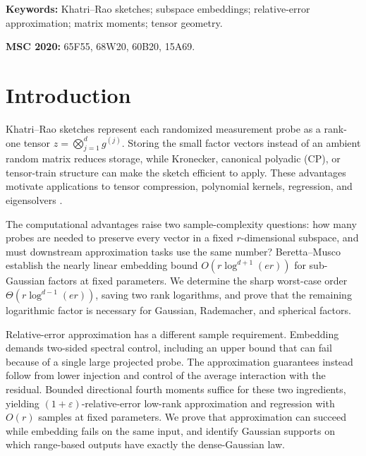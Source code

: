 \documentclass[11pt,a4paper]{article}
\theoremstyle{definition}\newtheorem{definition}[theorem]{Definition}
\theoremstyle{remark}\newtheorem{remark}[theorem]{Remark}
\numberwithin{equation}{section}
\begin{document}
\noindent\textbf{Keywords:} Khatri--Rao sketches; subspace embeddings;
relative-error approximation; matrix moments; tensor geometry.
\par\smallskip
\noindent\textbf{MSC 2020:} 65F55, 68W20, 60B20, 15A69.
\clearpage
\begingroup
\hypersetup{linkcolor=ContentsGreen}
\small\setlength{\parskip}{0pt}\setcounter{tocdepth}{2}
\tableofcontents
\endgroup
\clearpage


\section{Introduction}\label{sec:introduction}

Khatri--Rao sketches represent each randomized measurement probe as a
rank-one tensor $z=\bigotimes_{j=1}^d g^{(j)}$. Storing the small factor
vectors instead of an ambient random matrix reduces storage, while
Kronecker, canonical polyadic (CP), or tensor-train structure can make
the sketch efficient to apply. These advantages motivate applications
to tensor compression, polynomial kernels, regression, and eigensolvers
\cite{Ahle2020,RakhshanRabusseau2020,ChenJin2021,BGKL2026,SVB2026}.

The computational advantages raise two sample-complexity questions:
how many probes are needed to preserve every vector in a fixed
$r$-dimensional subspace, and must downstream approximation tasks use
the same number? Beretta--Musco~\cite[Theorem~1.3]{BM2026} establish
the nearly linear embedding bound $O(r\log^{d+1}(er))$ for
sub-Gaussian factors at fixed parameters. We determine the sharp
worst-case order $\Theta(r\log^{d-1}(er))$, saving two rank logarithms,
and prove that the remaining logarithmic factor is necessary for
Gaussian, Rademacher, and spherical factors.

Relative-error approximation has a different sample requirement.
Embedding demands two-sided spectral control, including an upper bound
that can fail because of a single large projected probe. The
approximation guarantees instead follow from lower injection and
control of the average interaction with the residual. Bounded
directional fourth moments suffice for these two ingredients, yielding
$(1+\varepsilon)$-relative-error low-rank approximation and regression
with $O(r)$ samples at fixed parameters. We prove that approximation
can succeed while embedding fails on the same input, and identify
Gaussian supports on which range-based outputs have exactly the
dense-Gaussian law.
\end{document}

